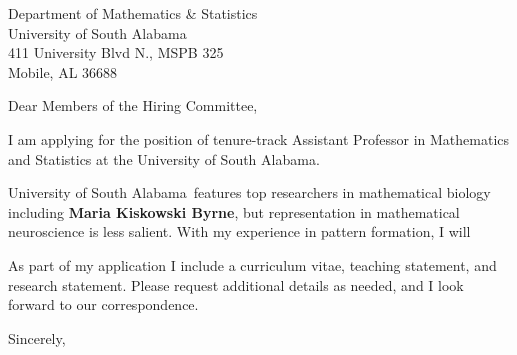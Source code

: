 \documentclass[11pt,a4paper]{letter}
\begin{document}

\def\School{University of South Alabama}

\begin{letter}
{Department of Mathematics \& Statistics\\
University of South Alabama\\
411 University Blvd N., MSPB 325\\
Mobile, AL 36688
}


\opening{Dear Members of the Hiring Committee,}

I am applying for the position of tenure-track Assistant Professor in Mathematics and Statistics at the \School. 



\School~features top researchers in mathematical biology including \textbf{Maria Kiskowski Byrne}, but representation in mathematical neuroscience is less salient. With my experience in pattern formation, I will 



As part of my application I include a curriculum vitae, teaching statement, and research statement. Please request additional details as needed, and I look forward to our correspondence.

\closing{Sincerely,}
\end{letter}
\end{document}
